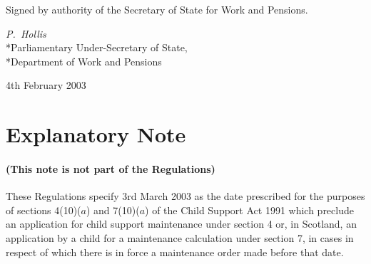 \documentclass[12pt,a4paper]{article}
\begin{document}
\bigskip

Signed 
by authority of the Secretary of State for Work and Pensions.

{\raggedleft
\emph{P.~Hollis}\\*Parliamentary Under-Secretary of State,\\*Department of Work and Pensions

}


4th February 2003

\small

\part{Explanatory Note}

\renewcommand\parthead{— Explanatory Note}

\subsection*{(This note is not part of the Regulations)}

These Regulations specify 3rd March 2003 as the date prescribed for the purposes of sections 4(10)($a$)  and 7(10)($a$)  of the Child Support Act 1991 which preclude an application for child support maintenance under section 4 or, in Scotland, an application by a child for a maintenance calculation under section 7, in cases in respect of which there is in force a maintenance order made before that date. 
\end{document}
